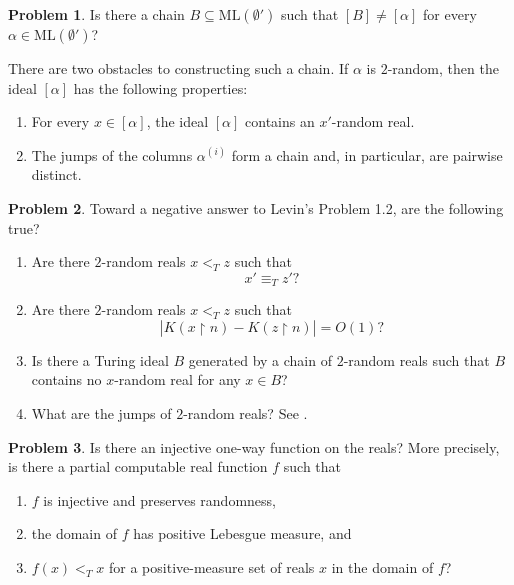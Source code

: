 \documentclass[11pt]{amsart}
\theoremstyle{definition}
\newtheorem{problem}{Problem}[section]
\begin{document}
\begin{problem}
    Is there a chain
    $B\subseteq\mathrm{ML}(\emptyset')$
    such that
    $[B]\neq[\alpha]$
    for every $\alpha\in\mathrm{ML}(\emptyset')$?
\end{problem}

There are two obstacles to constructing such a chain. If $\alpha$ is
$2$-random, then the ideal $[\alpha]$ has the following properties:
\begin{enumerate}
    \item[(i)] For every $x\in[\alpha]$, the ideal $[\alpha]$ contains an
    $x'$-random real.

    \item[(ii)] The jumps of the columns $\alpha^{(i)}$ form a chain and,
    in particular, are pairwise distinct.
\end{enumerate}

\begin{problem}
    Toward a negative answer to Levin's Problem 1.2, are the following true?
    \begin{enumerate}
        \item[(1)] Are there $2$-random reals $x<_T z$ such that
        \[
            x'\equiv_T z'?
        \]

        \item[(2)] Are there $2$-random reals $x<_T z$ such that
        \[
            \left|
                K(x\upharpoonright n)-K(z\upharpoonright n)
            \right|
            =
            O(1)?
        \]

        \item[(3)] Is there a Turing ideal $B$ generated by a chain of
        $2$-random reals such that $B$ contains no $x$-random real for
        any $x\in B$?

        \item[(4)] What are the jumps of $2$-random reals?
        See \cite{BDN}. 
    \end{enumerate}
\end{problem}

\begin{problem}
    Is there an injective one-way function on the reals? More precisely,
    is there a partial computable real function $f$ such that
    \begin{enumerate}
        \item[(i)] $f$ is injective and preserves randomness, 

        \item[(ii)] the domain of $f$ has positive Lebesgue measure, and 

        \item[(iii)]
        $f(x)<_T x$
        for a positive-measure set of reals $x$ in the domain of $f$?
    \end{enumerate}
\end{problem}
\end{document}
